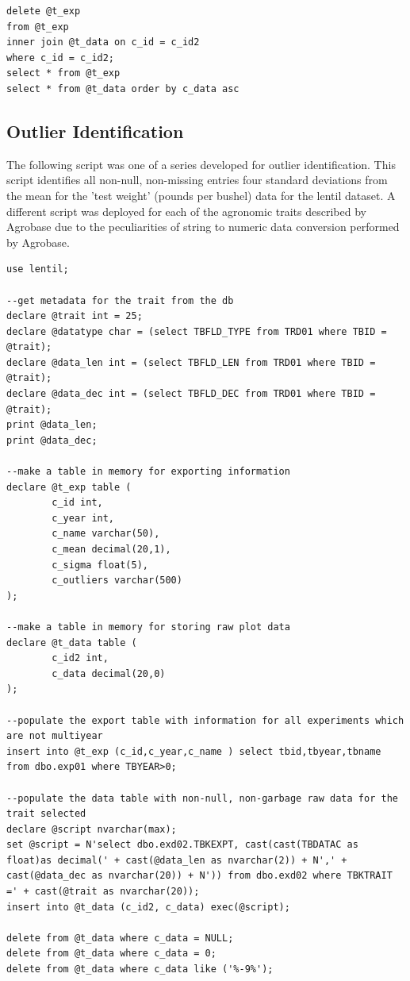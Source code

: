 \documentclass[12pt, letterpaper,oneocolumn]{article}
\begin{document}
\begin{appendices}
\begin{lstlisting}
delete @t_exp
from @t_exp
inner join @t_data on c_id = c_id2
where c_id = c_id2;
select * from @t_exp
select * from @t_data order by c_data asc
		\end{lstlisting}

		\subsection{Outlier Identification}
		The following script was one of a series developed for outlier identification. This script identifies all non-null, non-missing entries four standard deviations from the mean for the 'test weight' (pounds per bushel) data for the lentil dataset. A different script was deployed for each of the agronomic traits described by Agrobase due to the peculiarities of string to numeric data conversion performed by Agrobase.

		\lstset{language=SQL}
		\begin{lstlisting}
use lentil;

--get metadata for the trait from the db
declare @trait int = 25;
declare @datatype char = (select TBFLD_TYPE from TRD01 where TBID = @trait);
declare @data_len int = (select TBFLD_LEN from TRD01 where TBID = @trait);
declare @data_dec int = (select TBFLD_DEC from TRD01 where TBID = @trait);
print @data_len;
print @data_dec;

--make a table in memory for exporting information
declare @t_exp table (
		c_id int,
		c_year int,
		c_name varchar(50),
		c_mean decimal(20,1),
		c_sigma float(5),
		c_outliers varchar(500)
);

--make a table in memory for storing raw plot data
declare @t_data table (
		c_id2 int,
		c_data decimal(20,0)
);

--populate the export table with information for all experiments which are not multiyear
insert into @t_exp (c_id,c_year,c_name ) select tbid,tbyear,tbname from dbo.exp01 where TBYEAR>0;

--populate the data table with non-null, non-garbage raw data for the trait selected
declare @script nvarchar(max);
set @script = N'select dbo.exd02.TBKEXPT, cast(cast(TBDATAC as float)as decimal(' + cast(@data_len as nvarchar(2)) + N',' + cast(@data_dec as nvarchar(20)) + N')) from dbo.exd02 where TBKTRAIT =' + cast(@trait as nvarchar(20));
insert into @t_data (c_id2, c_data) exec(@script);

delete from @t_data where c_data = NULL;
delete from @t_data where c_data = 0;
delete from @t_data where c_data like ('%-9%');


\end{lstlisting}
\end{appendices}
\end{document}
